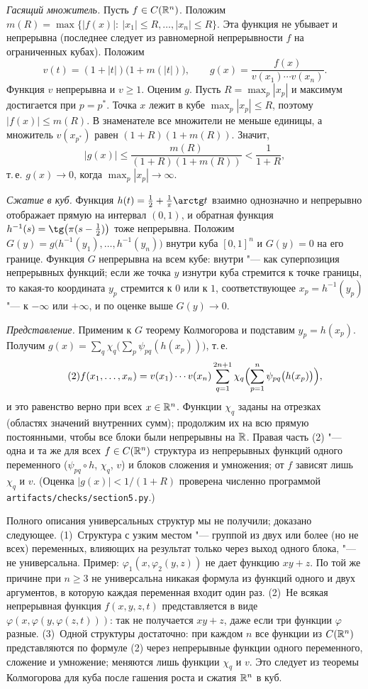 \begin{solution}[5 (\S\,5)]
\emph{Гасящий множитель.} Пусть $f\in C(\mathbb R^n)$. Положим
$m(R)=\max\{|f(x)|:\ |x_1|\le R,\dots,|x_n|\le R\}$. Эта функция не убывает
и непрерывна (последнее следует из равномерной непрерывности $f$ на
ограниченных кубах). Положим
\[
v(t)=(1+|t|)\bigl(1+m(|t|)\bigr),\qquad g(x)=\frac{f(x)}{v(x_1)\cdots v(x_n)} .
\]
Функция $v$ непрерывна и $v\ge1$. Оценим $g$. Пусть $R=\max_p|x_p|$
и максимум достигается при $p=p^*$. Точка $x$ лежит в кубе
$\max_p|x_p|\le R$, поэтому $|f(x)|\le m(R)$. В знаменателе все множители
не меньше единицы, а множитель $v(x_{p^*})$ равен $(1+R)(1+m(R))$. Значит,
\[
|g(x)|\le\frac{m(R)}{(1+R)(1+m(R))}<\frac1{1+R},
\]
т.\,е. $g(x)\to0$, когда $\max_p|x_p|\to\infty$.

\emph{Сжатие в куб.} Функция $h(t)=\frac12+\frac1\pi\arctg t$ взаимно
однозначно и непрерывно отображает прямую на интервал $(0,1)$, и обратная
функция $h^{-1}(s)=\tg\bigl(\pi(s-\frac12)\bigr)$ тоже непрерывна. Положим
$G(y)=g\bigl(h^{-1}(y_1),\dots,h^{-1}(y_n)\bigr)$ внутри куба $[0,1]^n$ и $G(y)=0$
на его границе. Функция $G$ непрерывна на всем кубе: внутри "--- как
суперпозиция непрерывных функций; если же точка $y$ изнутри куба стремится
к точке границы, то какая-то координата $y_p$ стремится к $0$ или к $1$,
соответствующее $x_p=h^{-1}(y_p)$ "--- к $-\infty$ или $+\infty$, и по оценке
выше $G(y)\to0$.

\emph{Представление.} Применим к $G$ теорему Колмогорова и подставим
$y_p=h(x_p)$. Получим $g(x)=\sum_q\chi_q\bigl(\sum_p\psi_{pq}(h(x_p))\bigr)$, т.\,е.
\begin{equation*}\tag{2}
f(x_1,\dots,x_n)=v(x_1)\cdots v(x_n)\sum_{q=1}^{2n+1}\chi_q\Bigl(\sum_{p=1}^{n}\psi_{pq}\bigl(h(x_p)\bigr)\Bigr),
\end{equation*}
и это равенство верно при всех $x\in\mathbb R^n$. Функции $\chi_q$ заданы на отрезках (областях значений внутренних сумм);
продолжим их на всю прямую постоянными, чтобы все блоки были непрерывны на
$\mathbb R$. Правая часть (2) "--- одна и та же для всех $f\in C(\mathbb R^n)$ структура
из непрерывных функций одного переменного ($\psi_{pq}\circ h$, $\chi_q$, $v$)
и блоков сложения и умножения; от $f$ зависят лишь $\chi_q$ и $v$.
(Оценка $|g(x)|<1/(1+R)$ проверена численно программой
\texttt{artifacts/checks/section5.py}.)

\answer Полного описания универсальных структур мы не получили; доказано
следующее. (1)~Структура с узким местом "--- группой из двух или более (но
не всех) переменных, влияющих на результат только через выход одного
блока, "--- не универсальна. Пример: $\varphi_1(x,\varphi_2(y,z))$ не дает
функцию $xy+z$. По той же причине при $n\ge3$ не универсальна никакая
формула из функций одного и двух аргументов, в которую каждая переменная
входит один раз. (2)~Не всякая непрерывная функция $f(x,y,z,t)$
представляется в виде $\varphi(x,\varphi(y,\varphi(z,t)))$: так не
получается $xy+z$, даже если три функции $\varphi$ разные. (3)~Одной
структуры достаточно: при каждом $n$ все функции из $C(\mathbb R^n)$
представляются по формуле (2) через непрерывные функции одного переменного,
сложение и умножение; меняются лишь функции $\chi_q$ и $v$. Это следует из
теоремы Колмогорова для куба после гашения роста и сжатия $\mathbb R^n$ в куб.
\end{solution}


